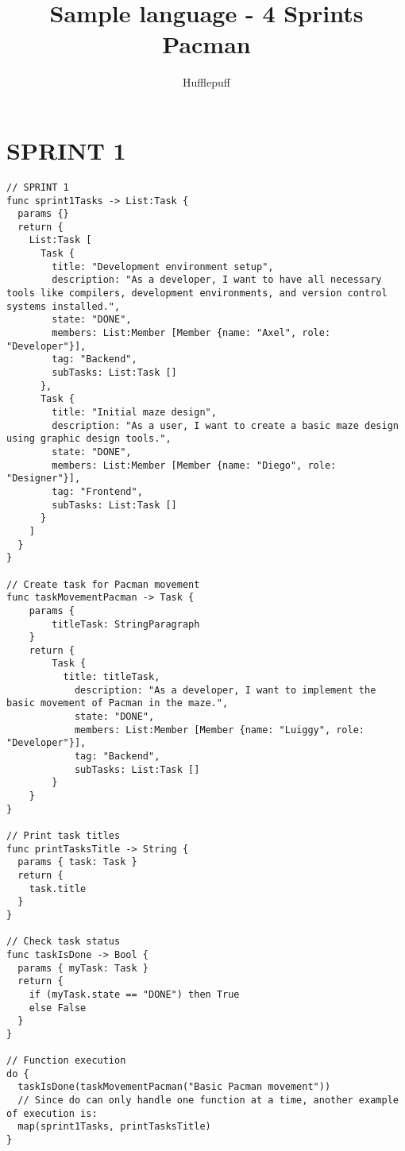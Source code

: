 \documentclass{article}
\title{Sample language - 4 Sprints Pacman}
\author{Hufflepuff}
\begin{document}
\maketitle

\section{SPRINT 1}
\begin{verbatim}
// SPRINT 1
func sprint1Tasks -> List:Task {
  params {}
  return {
    List:Task [
      Task {
        title: "Development environment setup",
        description: "As a developer, I want to have all necessary tools like compilers, development environments, and version control systems installed.",
        state: "DONE",
        members: List:Member [Member {name: "Axel", role: "Developer"}],
        tag: "Backend",
        subTasks: List:Task []
      },
      Task {
        title: "Initial maze design",
        description: "As a user, I want to create a basic maze design using graphic design tools.",
        state: "DONE",
        members: List:Member [Member {name: "Diego", role: "Designer"}],
        tag: "Frontend",
        subTasks: List:Task []
      }
    ]
  }
}

// Create task for Pacman movement
func taskMovementPacman -> Task {
    params {
        titleTask: StringParagraph
    }
    return {
        Task {
          title: titleTask,
	        description: "As a developer, I want to implement the basic movement of Pacman in the maze.",
	        state: "DONE",
	        members: List:Member [Member {name: "Luiggy", role: "Developer"}],
	        tag: "Backend",
	        subTasks: List:Task []
        }
    }
}

// Print task titles
func printTasksTitle -> String {
  params { task: Task }
  return {
    task.title
  }
}

// Check task status
func taskIsDone -> Bool {
  params { myTask: Task }
  return {
    if (myTask.state == "DONE") then True
    else False
  }
}

// Function execution
do {
  taskIsDone(taskMovementPacman("Basic Pacman movement"))
  // Since do can only handle one function at a time, another example of execution is:
  map(sprint1Tasks, printTasksTitle)
}
\end{verbatim}
\end{document}
